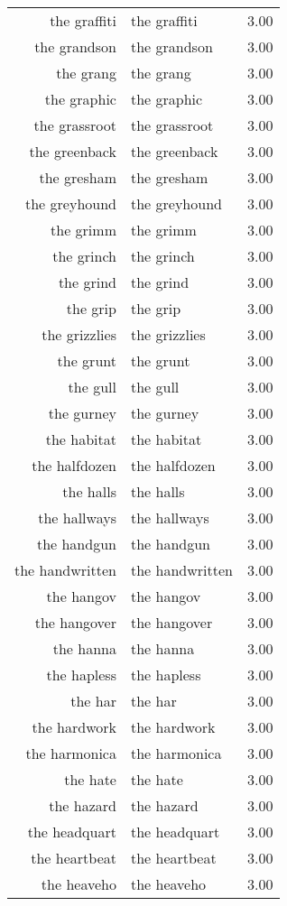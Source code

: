 \begin{table}[ht]
\begin{tabular}{rlr}
  the graffiti & the graffiti & 3.00 \\ 
  the grandson & the grandson & 3.00 \\ 
  the grang & the grang & 3.00 \\ 
  the graphic & the graphic & 3.00 \\ 
  the grassroot & the grassroot & 3.00 \\ 
  the greenback & the greenback & 3.00 \\ 
  the gresham & the gresham & 3.00 \\ 
  the greyhound & the greyhound & 3.00 \\ 
  the grimm & the grimm & 3.00 \\ 
  the grinch & the grinch & 3.00 \\ 
  the grind & the grind & 3.00 \\ 
  the grip & the grip & 3.00 \\ 
  the grizzlies & the grizzlies & 3.00 \\ 
  the grunt & the grunt & 3.00 \\ 
  the gull & the gull & 3.00 \\ 
  the gurney & the gurney & 3.00 \\ 
  the habitat & the habitat & 3.00 \\ 
  the halfdozen & the halfdozen & 3.00 \\ 
  the halls & the halls & 3.00 \\ 
  the hallways & the hallways & 3.00 \\ 
  the handgun & the handgun & 3.00 \\ 
  the handwritten & the handwritten & 3.00 \\ 
  the hangov & the hangov & 3.00 \\ 
  the hangover & the hangover & 3.00 \\ 
  the hanna & the hanna & 3.00 \\ 
  the hapless & the hapless & 3.00 \\ 
  the har & the har & 3.00 \\ 
  the hardwork & the hardwork & 3.00 \\ 
  the harmonica & the harmonica & 3.00 \\ 
  the hate & the hate & 3.00 \\ 
  the hazard & the hazard & 3.00 \\ 
  the headquart & the headquart & 3.00 \\ 
  the heartbeat & the heartbeat & 3.00 \\ 
  the heaveho & the heaveho & 3.00 \\ 

\end{tabular}
\end{table}
